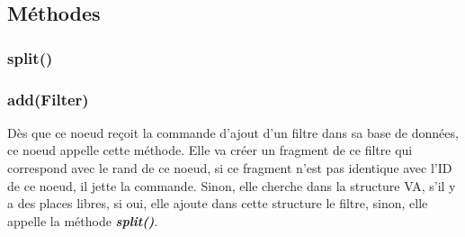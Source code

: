 \documentclass[a4paper,11pt]{report}
\begin{document}
\subsection{Méthodes}
\subsubsection{split()}
	

\subsubsection{add(Filter)}
	Dès que ce noeud reçoit la commande d'ajout d'un filtre dans sa base de données, ce noeud appelle cette méthode. Elle va créer un fragment de ce filtre qui correspond avec le rand de ce noeud, si ce fragment n'est pas identique avec l'ID de ce noeud, il jette la commande. Sinon, elle cherche dans la structure VA, s'il y a des places libres, si oui, elle ajoute dans cette structure le filtre, sinon, elle appelle la méthode \textbf{\textit{split()}}.
\end{document}
